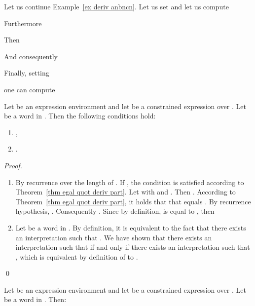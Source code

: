 \documentclass[a4paper]{llncs}
\begin{document}
  \begin{example}\label{ex deriv anbncn abc}
    Let us continue Example~\ref{ex deriv anbncn}.
    Let us set  and let us compute 
    
    Furthermore
    
    Then
    
    And consequently
    
    Finally, setting
    
    one can compute
    
  \end{example}
  
  \begin{theorem}
    Let  be an expression environment and let  be a constrained expression over . Let  be a word in . Then the following conditions hold:
    \begin{enumerate}
      \item ,
      \item .
    \end{enumerate}
  \end{theorem}
  \begin{proof}
    \ 
    \begin{enumerate}
      \item By recurrence over the length of . If , the condition is satisfied according to Theorem~\ref{thm egal quot deriv part}. Let  with  and . Then . According to Theorem~\ref{thm egal quot deriv part}, it holds that    that equals . By recurrence hypothesis, .       
      Consequently . Since by definition,  is equal to , then 
      
      \item Let  be a word in . By definition, it is equivalent to the fact that there exists an interpretation  such that . We have shown that there exists an interpretation  such that  if and only if there exists an interpretation  such that , which is equivalent by definition of  to .
    \end{enumerate}
    \qed
  \end{proof}
  
  \begin{corollary}
    Let  be an expression environment and let  be a constrained expression over . Let  be a word in . Then:
        
  \end{corollary} 
  
\end{document}
